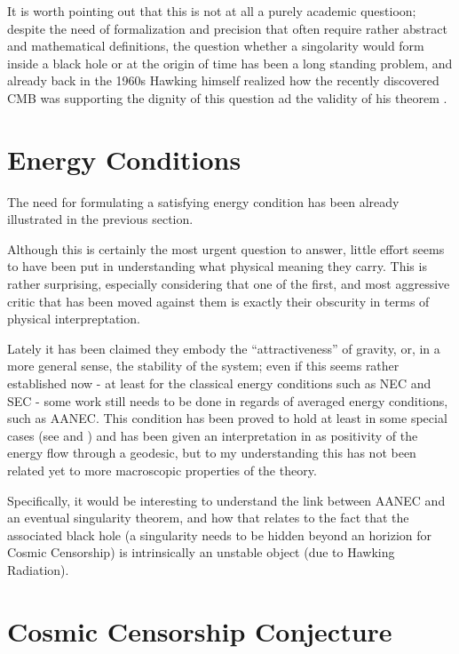 \documentclass[12pt, a4paper]{article}
\begin{document}
It is worth pointing out that this is not at all a purely academic questioon; despite the need of formalization and precision that often require rather abstract and mathematical definitions, the question whether a singolarity would form inside a black hole or at the origin of time has been a long standing problem, and already back in the 1960s Hawking himself realized how the recently discovered CMB was supporting the dignity of this question ad the validity of his theorem \cite{hawking1968cosmic}.

\section{Energy Conditions}

The need for formulating a satisfying energy condition has been already illustrated in the previous section.

Although this is certainly the most urgent question to answer, little effort seems to have been put in understanding what physical meaning they carry. This is rather surprising, especially considering that one of the first, and most aggressive critic that has been moved against them is exactly their obscurity in terms of physical interpreptation.

Lately it has been claimed they embody the ``attractiveness''  of gravity, or, in a more general sense, the stability of the system; even if this seems rather established now - at least for the classical energy conditions such as NEC and SEC - some work still needs to be done in regards of averaged energy conditions, such as AANEC. 
This condition has been proved to hold at least in some special cases (see \cite{wall2010proving} and \cite{verch2000averaged}) and has been given an interpretation in \cite{curiel2017primer} as positivity of the energy flow through a geodesic, but to my understanding this has not been related yet to more macroscopic properties of the theory.

Specifically, it would be interesting to understand the link between AANEC and an eventual singularity theorem, and how that relates to the fact that the associated black hole (a singularity needs to be hidden beyond an horizion for Cosmic Censorship) is intrinsically an unstable object (due to Hawking Radiation).

\section{Cosmic Censorship Conjecture}
\end{document}
